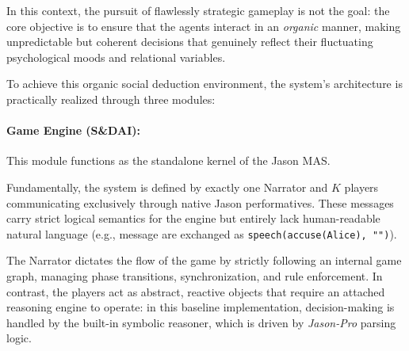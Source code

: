 \documentclass[12pt]{article}
\begin{document}
In this context, the pursuit of  flawlessly strategic gameplay is not the goal: the core objective is to ensure that the agents interact in an \emph{organic} manner, making unpredictable but coherent decisions that genuinely reflect their fluctuating psychological moods and relational variables. 

To achieve this organic social deduction environment, the system's architecture is practically realized through three modules:

\paragraph{Game Engine (S\&DAI):}
This module functions as the standalone kernel of the Jason MAS. 

Fundamentally, the system is defined by exactly one Narrator and $K$ players communicating exclusively through native Jason performatives. These messages carry strict logical semantics for the engine but entirely lack human-readable natural language (e.g., message are exchanged as  \texttt{speech(accuse(Alice), "")}). 

The Narrator dictates the flow of the game by strictly following an internal game graph, managing phase transitions, synchronization, and rule enforcement. 
In contrast, the players act as abstract, reactive objects that require an attached reasoning engine to operate: in this baseline implementation, decision-making is handled by the built-in symbolic reasoner, which is driven by \emph{Jason-Pro} parsing logic. 
\end{document}

